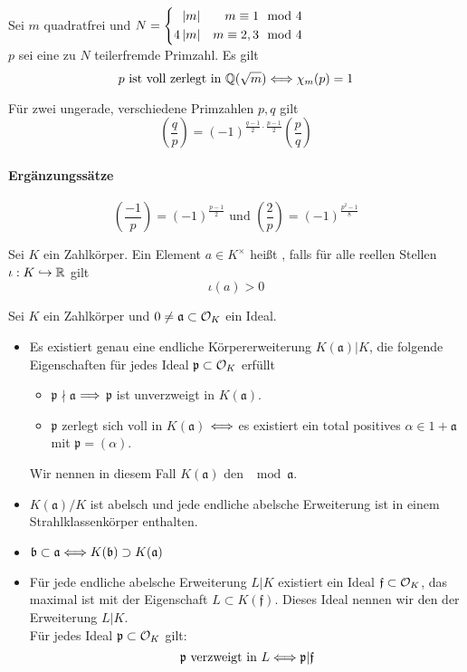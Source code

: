 \documentclass{book}
\newcommand{\af}{\mathfrak{a}}
\renewcommand{\bf}{\mathfrak{b}}
\newcommand{\ff}{\mathfrak{f}}
\newcommand{\pf}{\mathfrak{p}}
\newcommand{\Leg}[2]{\left(\frac{#1}{#2}\right)}
\begin{document}
\Satz{}
Sei $m$ quadratfrei und $N = 
\left\lbrace\begin{aligned}
\left|m\right| && m \equiv 1 \mod{4}\\
4\left|m\right| && m \equiv 2,3 \mod{4}
\end{aligned}\right.$\\
$p$ sei eine zu $N$ teilerfremde Primzahl. Es gilt
\[ p \text{ ist voll zerlegt in } \mathbb{Q}(\sqrt{m}) \overset{}{\Longleftrightarrow} \chi_m(p) = 1 \]

Für zwei ungerade, verschiedene Primzahlen $p,q$ gilt
\[ \Leg{q}{p} = (-1)^{\frac{q-1}{2} \cdot \frac{p-1}{2} } \Leg{p}{q} \]

\paragraph{Ergänzungssätze}
\[ \Leg{-1}{p} = (-1)^{\frac{p-1}{2}} \text{ und } \Leg{2}{p} = (-1)^{\frac{p^2-1}{8}} \]

\Def{}
Sei $K$ ein Zahlkörper. Ein Element $a \in K^\times$ heißt , falls für alle reellen Stellen $\iota : K \overset{}{\hookrightarrow} \mathbb{R}$ gilt
\[ \iota(a) > 0 \]

Sei $K$ ein Zahlkörper und $0\neq \af \subset \O_K$ ein Ideal.
\begin{itemize}
\item Es existiert genau eine endliche Körpererweiterung $K(\af)|K$, die folgende Eigenschaften für jedes Ideal $\pf \subset \O_K$ erfüllt
\begin{itemize}
\item $\pf\nmid \af$ $\overset{}{\Longrightarrow}$ $\pf$ ist unverzweigt in $K(\af)$.
\item $\pf$ zerlegt sich voll in $K(\af)$ $\overset{}{\Longleftrightarrow}$ es existiert ein total positives $\alpha \in 1 + \af$ mit $\pf = (\alpha)$.
\end{itemize}
Wir nennen in diesem Fall $K(\af)$ den  $\mod{\af}$.
\item $K(\af) /K$ ist abelsch und jede endliche abelsche Erweiterung ist in einem Strahlklassenkörper enthalten.
\item $\bf \subset \af \Gdw{} K(\bf) \supset K(\af)$
\item Für jede endliche abelsche Erweiterung $L|K$ existiert ein Ideal $\ff \subset \O_K$, das maximal ist mit der Eigenschaft $L\subset K(\ff)$. Dieses Ideal nennen wir den  der Erweiterung $L|K$.\\
Für jedes Ideal $\pf \subset \O_K$ gilt:
\[ \pf \text{ verzweigt in } L \Gdw{} \pf | \ff \] 
\end{itemize}
\end{document}
